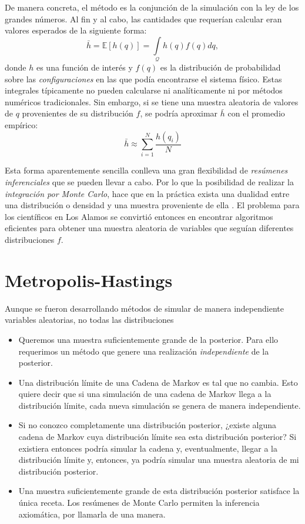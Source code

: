 De manera concreta, el método es la conjunción de la simulación con la ley de los grandes números. Al fin y al cabo, las cantidades que requerían calcular eran valores esperados de la siguiente forma: 
\begin{equation*}
\bar{h} = \mathbb{E}[h(q)]=\int\limits_\mathcal{Q} h(q)f(q)dq ,
\end{equation*} 
donde $h$ es una función de interés y $f(q)$ es la distribución de probabilidad sobre las \textit{configuraciones} en las que podía encontrarse el sistema físico. Estas integrales típicamente no pueden calcularse ni analíticamente ni por métodos numéricos tradicionales. Sin embargo, si se tiene una muestra aleatoria de valores de $q$ provenientes de su distribución $f$, se podría aproximar $\bar{h}$ con el promedio empírico: 
\begin{equation*}
\bar{h} \approx \sum\limits_{i=1}^N \dfrac{h(q_i)}{N}
\end{equation*}

Esta forma aparentemente sencilla conlleva una gran flexibilidad de \textit{resúmenes inferenciales} que se pueden llevar a cabo. Por lo que la posibilidad de realizar la \textit{integración por Monte Carlo}, hace que en la práctica exista una dualidad entre una distribución o densidad y una muestra proveniente de ella \parencite{SmithGelfand92}. El problema para los científicos en Los Alamos se convirtió entonces en encontrar algoritmos eficientes para obtener una muestra aleatoria de variables que seguían diferentes distribuciones $f$.

\section{Metropolis-Hastings}

Aunque se fueron desarrollando métodos de simular de manera independiente variables aleatorias, no todas las distribuciones 

\begin{itemize}
\item Queremos una muestra suficientemente grande de la posterior. Para ello requerimos un método que genere una realización \textit{independiente} de la posterior. 

\item Una distribución límite de una Cadena de Markov es tal que no cambia. Esto quiere decir que si una simulación de una cadena de Markov llega a la distribución límite, cada nueva simulación se genera de manera independiente. 

\item Si no conozco completamente una distribución posterior, ¿existe alguna cadena de Markov cuya distribución límite sea esta distribución posterior? Si existiera entonces podría simular la cadena y, eventualmente, llegar a la distribución límite y, entonces, ya podría simular una muestra aleatoria de mi distribución posterior.

\item Una muestra suficientemente grande de esta distribución posterior satisface la única receta. Los resúmenes de Monte Carlo permiten la inferencia axiomática, por llamarla de una manera.  
\end{itemize}




